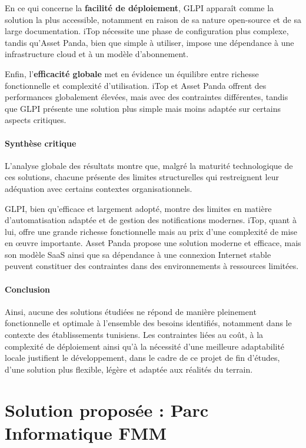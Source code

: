 En ce qui concerne la \textbf{facilité de déploiement}, GLPI apparaît comme la solution la plus accessible, notamment en raison de sa nature open-source et de sa large documentation. iTop nécessite une phase de configuration plus complexe, tandis qu’Asset Panda, bien que simple à utiliser, impose une dépendance à une infrastructure cloud et à un modèle d’abonnement.

Enfin, l’\textbf{efficacité globale} met en évidence un équilibre entre richesse fonctionnelle et complexité d’utilisation. iTop et Asset Panda offrent des performances globalement élevées, mais avec des contraintes différentes, tandis que GLPI présente une solution plus simple mais moins adaptée sur certains aspects critiques.

\paragraph{Synthèse critique}

L’analyse globale des résultats montre que, malgré la maturité technologique de ces solutions, chacune présente des limites structurelles qui restreignent leur adéquation avec certains contextes organisationnels.

GLPI, bien qu’efficace et largement adopté, montre des limites en matière d’automatisation adaptée et de gestion des notifications modernes. iTop, quant à lui, offre une grande richesse fonctionnelle mais au prix d’une complexité de mise en œuvre importante. Asset Panda propose une solution moderne et efficace, mais son modèle SaaS ainsi que sa dépendance à une connexion Internet stable peuvent constituer des contraintes dans des environnements à ressources limitées.

\paragraph{Conclusion}

Ainsi, aucune des solutions étudiées ne répond de manière pleinement fonctionnelle et optimale à l’ensemble des besoins identifiés, notamment dans le contexte des établissements tunisiens. Les contraintes liées au coût, à la complexité de déploiement ainsi qu’à la nécessité d’une meilleure adaptabilité locale justifient le développement, dans le cadre de ce projet de fin d’études, d’une solution plus flexible, légère et adaptée aux réalités du terrain.
\section{Solution proposée : Parc Informatique FMM}

